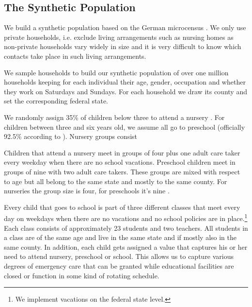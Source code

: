 \subsection{The Synthetic Population}
\label{subsec:synthetic_population}

We build a synthetic population based on the German microcensus \citep{FDSAeDBUDL2018}.
We only use private households, i.e. exclude living arrangements such as nursing homes as
non-private households vary widely in size and it is very difficult to know which
contacts take place in such living arrangements.

We sample households to build our synthetic population of over one million households
keeping for each individual their age, gender, occupation and whether they work on
Saturdays and Sundays. For each household we draw its county and set the corresponding
federal state.%

We randomly assign 35\% of children below three to attend a nursery \citep{Destatis2020}.
For children between three and six years old, we assume all go to preschool (officially
92.5\% according to \cite{Destatis2020}). Nursery groups consist

Children that attend a nursery meet in groups of four plus one adult care taker every
weekday when there are no school vacations. Preschool children meet in groups of nine
with two adult care takers. These groups are mixed with respect to age but all belong to
the same state and mostly to the same county. For nurseries the group size is four, for
preschools it's nine \citep{BertelsmannStiftung2019}.

Every child that goes to school is part of three different classes that meet every day on
weekdays when there are no vacations and no school policies are in place.\footnote{We
implement vacations on the federal state level.} Each class consists of approximately 23
students \citep{OECD2013} and two teachers. All students in a class are of the same age
and live in the same state and if mostly also in the same county. In addition, each
child gets assigned a value that captures his or her need to attend nursery, preschool or
school. This allows us to capture various degrees of emergency care that can be granted
while educational facilities are closed or function in some kind of rotating schedule.

